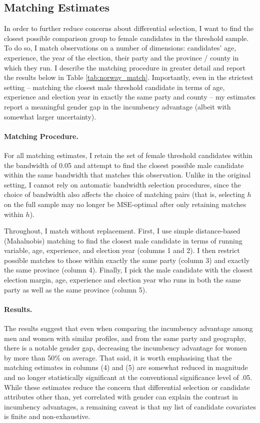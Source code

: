 \documentclass[12pt]{article}
\begin{document}
\clearpage
\subsection{Matching Estimates}
\label{app:matching}

In order to further reduce concerns about differential selection, I want to find the closest possible comparison group to female candidates in the threshold sample. To do so, I match observations on a number of dimensions: candidates' age, experience, the year of the election, their party and the province / county in which they run. I describe the matching procedure in greater detail and report the results below in Table \ref{tab:norway_match}. Importantly, even in the strictest setting -- matching the closest male threshold candidate in terms of age, experience and election year in exactly the same party and county -- my estimates report a meaningful gender gap in the incumbency advantage (albeit with somewhat larger uncertainty).

\paragraph*{Matching Procedure.} For all matching estimates, I retain the set of female threshold candidates within the bandwidth of 0.05 and attempt to find the closest possible male candidate within the same bandwidth that matches this observation. Unlike in the original setting, I cannot rely on automatic bandwidth selection procedures, since the choice of bandwidth also affects the choice of matching pairs (that is, selecting $h$ on the full sample may no longer be MSE-optimal after only retaining matches within $h$).

Throughout, I match without replacement. First, I use simple distance-based (Mahalnobis) matching to find the closest male candidate in terms of running variable, age, experience, and election year (columns 1 and 2). I then restrict possible matches to those within exactly the same party (column 3) and exactly the same province (column 4). Finally, I pick the male candidate with the closest election margin, age, experience and election year who runs in both the same party as well as the same province (column 5).

\paragraph*{Results.} The results suggest that even when comparing the incumbency advantage among men and women with similar profiles, and from the same party and geography, there is a notable gender gap, decreasing the incumbency advantage for women by more than 50\% on average. That said, it is worth emphasising that the matching estimates in columns (4) and (5) are somewhat reduced in magnitude and no longer statistically significant at the conventional significance level of .05. While these estimates reduce the concern that differential selection or candidate attributes other than, yet correlated with gender can explain the contrast in incumbency advantages, a remaining caveat is that my list of candidate covariates is finite and non-exhaustive.
\end{document}

